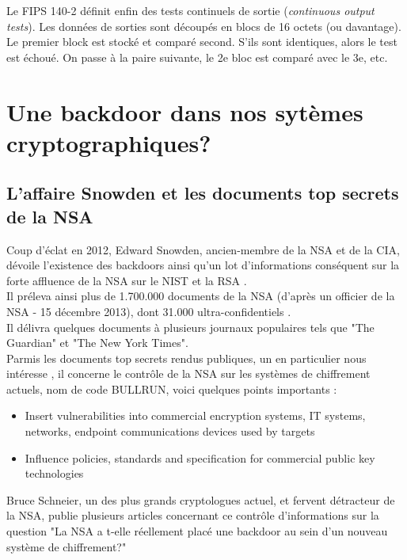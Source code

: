 		
		Le FIPS 140-2 définit enfin des tests continuels de sortie 
		(\textit{continuous output tests}). Les données de sorties sont découpés 
		en blocs de 16 octets (ou davantage). Le premier block est stocké et 
		comparé second. S'ils sont identiques, alors le test est échoué. On passe 
		à la paire suivante, le 2e bloc est comparé avec le 3e, etc.

\section{Une backdoor dans nos sytèmes cryptographiques?}

	\subsection{L'affaire Snowden et les documents top secrets de la NSA}
	
	Coup d'éclat en 2012, Edward Snowden, ancien-membre de la NSA et de
	la CIA,	dévoile l'existence des backdoors ainsi qu'un lot
	d'informations conséquent sur la forte affluence de la NSA
	sur le NIST et la RSA \cite{snowden2013reuters}.\\
	
	Il préleva ainsi plus de 1.700.000 documents de la NSA (d'après un 
	officier de la NSA - 15 décembre 2013), dont 31.000 
	ultra-confidentiels \cite{wikiSnowden}.\\
	
	Il délivra quelques documents à plusieurs journaux populaires
	tels que "The Guardian" et "The New York Times".\\
	
	Parmis les documents top secrets rendus publiques, un en particulier
	nous intéresse \cite{topsecretNSA}, il concerne le contrôle de la NSA 
	sur les systèmes de chiffrement actuels, nom de code BULLRUN,
	voici quelques points importants :
	\begin{itemize}
		\item Insert vulnerabilities into commercial encryption systems, IT 
		systems, networks, endpoint communications devices used by targets
		\item Influence policies, standards and specification for commercial 
		public key technologies\\
	\end{itemize}
	
	Bruce Schneier, un des plus grands cryptologues actuel,
	et fervent détracteur de la NSA, publie plusieurs articles concernant
	ce contrôle d'informations sur la question "La NSA a t-elle 
	réellement placé une backdoor au sein d'un nouveau système de 
	chiffrement?" \cite{schneier2007NSA} \\

